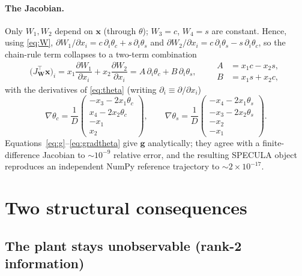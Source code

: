 \documentclass[11pt]{article}
\newcommand{\vx}{\mathbf{x}}
\newcommand{\vW}{\mathbf{W}}
\newcommand{\vg}{\mathbf{g}}
\newcommand{\grad}{\nabla}
\begin{document}
\paragraph{The Jacobian.}
Only $W_1,W_2$ depend on $\vx$ (through $\theta$); $W_3=c$, $W_4=s$ are
constant. Hence, using \eqref{eq:W},
$\partial W_1/\partial x_i = c\,\partial_i\theta_c + s\,\partial_i\theta_s$
and
$\partial W_2/\partial x_i = c\,\partial_i\theta_s - s\,\partial_i\theta_c$,
so the chain-rule term collapses to a two-term combination
\begin{equation}
  \big(J_{\!\vW}^{\top}\vx\big)_i
   = x_1\frac{\partial W_1}{\partial x_i} + x_2\frac{\partial W_2}{\partial x_i}
   = A\,\partial_i\theta_c + B\,\partial_i\theta_s,
  \qquad
  \begin{aligned}
    A &= x_1 c - x_2 s,\\
    B &= x_1 s + x_2 c,
  \end{aligned}
  \label{eq:AB}
\end{equation}
with the derivatives of \eqref{eq:theta} (writing $\partial_i\equiv\partial/\partial x_i$)
\begin{equation}
  \grad\theta_c = \frac1D\!
  \begin{pmatrix} -x_3-2x_1\theta_c\\ x_4-2x_2\theta_c\\ -x_1\\ x_2\end{pmatrix}\!,
  \qquad
  \grad\theta_s = \frac1D\!
  \begin{pmatrix} -x_4-2x_1\theta_s\\ -x_3-2x_2\theta_s\\ -x_2\\ -x_1\end{pmatrix}\!.
  \label{eq:gradtheta}
\end{equation}
Equations~\eqref{eq:g}--\eqref{eq:gradtheta} give $\vg$ analytically; they
agree with a finite-difference Jacobian to $\sim\!10^{-9}$ relative error,
and the resulting SPECULA object reproduces an independent NumPy reference
trajectory to $\sim\!2\times10^{-17}$.

\section{Two structural consequences}
\label{sec:consequences}

\subsection{The plant stays unobservable (rank-2 information)}
\label{sec:rank}
\end{document}
